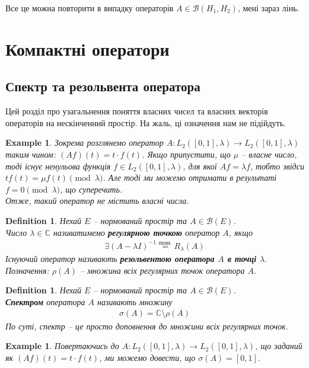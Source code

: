\documentclass[a4paper, 10pt]{article}
\theoremstyle{theoremdd}
\theoremstyle{theoremdd}
\newtheorem{definition}[theorem]{Definition}
\theoremstyle{theoremdd}
\theoremstyle{theoremdd}
\newtheorem{example}[theorem]{Example}
\theoremstyle{theoremdd}
\theoremstyle{theoremdd}
\theoremstyle{theoremdd}
\theoremstyle{theoremdd}
\begin{document}
Все це можна повторити в випадку операторів $A \in \mathcal{B}(H_1,H_2)$, мені зараз лінь.
\newpage

\section{Компактні оператори}
\subsection{Спектр та резольвента оператора}
Цей розділ про узагальнення поняття власних чисел та власних векторів операторів на нескінченний простір. На жаль, ці означення нам не підійдуть.

\begin{example}
Зокрема розглянемо оператор $A \colon L_2([0,1],\lambda) \to L_2([0,1],\lambda)$ таким чином: $(Af)(t) = t \cdot f(t)$. Якщо припустити, що $\mu$ -- власне число, тоді існує ненульова функція $f \in L_2([0,1],\lambda)$, для якої $Af = \lambda f$, тобто звідси $t f(t) = \mu f(t) \pmod \lambda$. Але тоді ми можемо отримати в результаті $f = 0 \pmod \lambda$, що суперечить.\\
Отже, такий оператор не містить власні числа.
\end{example}

\begin{definition}
Нехай $E$ -- нормований простір та $A \in \mathcal{B}(E)$.\\
Число $\lambda \in \mathbb{C}$ називатимемо \textbf{регулярною точкою} оператор $A$, якщо
\begin{align*}
\exists (A-\lambda I)^{-1} \overset{\text{позн.}}{=} R_\lambda(A)
\end{align*}
Існуючий оператор називають \textbf{резольвентою оператора $A$ в точці $\lambda$}.\\ 
Позначення: $\rho(A)$ -- множина всіх регулярних точок оператора $A$.
\end{definition}

\begin{definition}
Нехай $E$ -- нормований простір та $A \in \mathcal{B}(E)$.\\
\textbf{Спектром} оператора $A$ називають множину
\begin{align*}
\sigma(A) = \mathbb{C} \setminus \rho(A)
\end{align*}
По суті, спектр -- це просто доповнення до множини всіх регулярних точок.
\end{definition}

\begin{example}
Повертаючись до $A \colon L_2([0,1],\lambda) \to L_2([0,1],\lambda)$, що заданий як $(Af)(t) = t \cdot f(t)$, ми можемо довести, що $\sigma(A) = [0,1]$.
\end{example}
\end{document}
